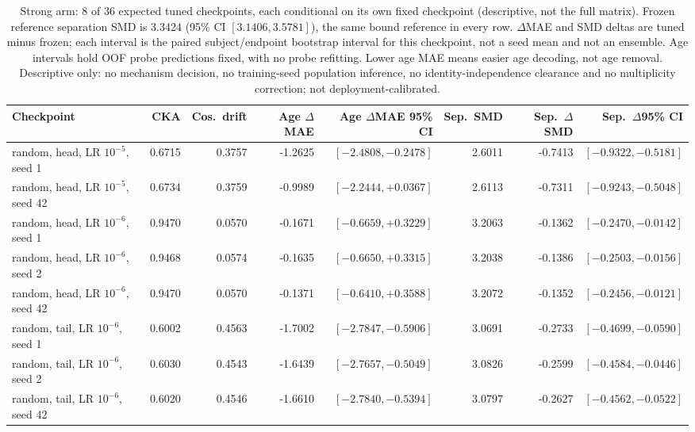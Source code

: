 \begin{table}[!t]
\caption{Strong arm: 8 of 36 expected tuned checkpoints, each conditional on its own fixed checkpoint (descriptive, not the full matrix). Frozen reference separation SMD is 3.3424 (95\% CI $[3.1406,3.5781]$), the same bound reference in every row. $\Delta$MAE and SMD deltas are tuned minus frozen; each interval is the paired subject/endpoint bootstrap interval for this checkpoint, not a seed mean and not an ensemble. Age intervals hold OOF probe predictions fixed, with no probe refitting. Lower age MAE means easier age decoding, not age removal. Descriptive only: no mechanism decision, no training-seed population inference, no identity-independence clearance and no multiplicity correction; not deployment-calibrated.}
\label{tab:common-mechanism-strong}
\centering\scriptsize
\begin{tabular}{@{}lrrrrrrr@{}}
\toprule
Checkpoint & CKA & Cos.\ drift & Age $\Delta$MAE & Age $\Delta$MAE 95\% CI & Sep.\ SMD & Sep.\ $\Delta$SMD & Sep.\ $\Delta$95\% CI \\
\midrule
random, head, LR $10^{-5}$, seed 1 & 0.6715 & 0.3757 & -1.2625 & $[-2.4808,-0.2478]$ & 2.6011 & -0.7413 & $[-0.9322,-0.5181]$ \\
random, head, LR $10^{-5}$, seed 42 & 0.6734 & 0.3759 & -0.9989 & $[-2.2444,+0.0367]$ & 2.6113 & -0.7311 & $[-0.9243,-0.5048]$ \\
random, head, LR $10^{-6}$, seed 1 & 0.9470 & 0.0570 & -0.1671 & $[-0.6659,+0.3229]$ & 3.2063 & -0.1362 & $[-0.2470,-0.0142]$ \\
random, head, LR $10^{-6}$, seed 2 & 0.9468 & 0.0574 & -0.1635 & $[-0.6650,+0.3315]$ & 3.2038 & -0.1386 & $[-0.2503,-0.0156]$ \\
random, head, LR $10^{-6}$, seed 42 & 0.9470 & 0.0570 & -0.1371 & $[-0.6410,+0.3588]$ & 3.2072 & -0.1352 & $[-0.2456,-0.0121]$ \\
random, tail, LR $10^{-6}$, seed 1 & 0.6002 & 0.4563 & -1.7002 & $[-2.7847,-0.5906]$ & 3.0691 & -0.2733 & $[-0.4699,-0.0590]$ \\
random, tail, LR $10^{-6}$, seed 2 & 0.6030 & 0.4543 & -1.6439 & $[-2.7657,-0.5049]$ & 3.0826 & -0.2599 & $[-0.4584,-0.0446]$ \\
random, tail, LR $10^{-6}$, seed 42 & 0.6020 & 0.4546 & -1.6610 & $[-2.7840,-0.5394]$ & 3.0797 & -0.2627 & $[-0.4562,-0.0522]$ \\
\bottomrule
\end{tabular}
\end{table}
